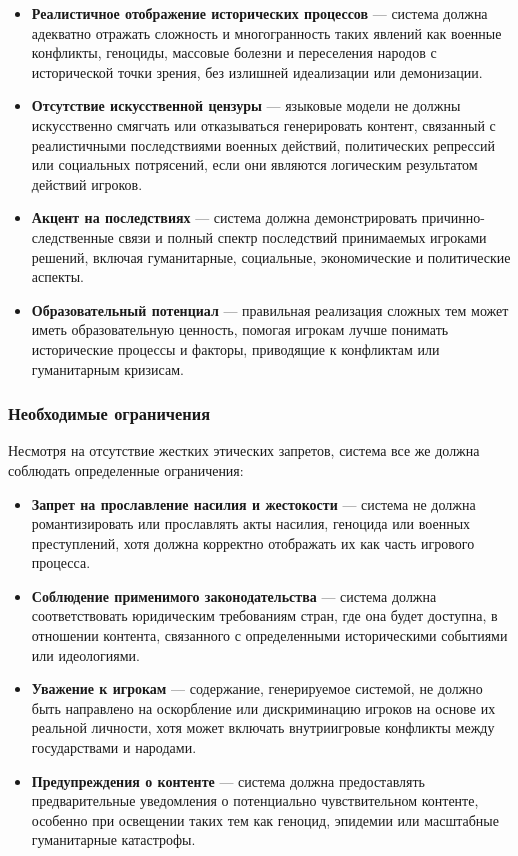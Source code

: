 \begin{itemize}
    \item \textbf{Реалистичное отображение исторических процессов} — система должна адекватно отражать сложность и многогранность таких явлений как военные конфликты, геноциды, массовые болезни и переселения народов с исторической точки зрения, без излишней идеализации или демонизации.

    \item \textbf{Отсутствие искусственной цензуры} — языковые модели не должны искусственно смягчать или отказываться генерировать контент, связанный с реалистичными последствиями военных действий, политических репрессий или социальных потрясений, если они являются логическим результатом действий игроков.

    \item \textbf{Акцент на последствиях} — система должна демонстрировать причинно-следственные связи и полный спектр последствий принимаемых игроками решений, включая гуманитарные, социальные, экономические и политические аспекты.

    \item \textbf{Образовательный потенциал} — правильная реализация сложных тем может иметь образовательную ценность, помогая игрокам лучше понимать исторические процессы и факторы, приводящие к конфликтам или гуманитарным кризисам.
\end{itemize}

\subsubsection{Необходимые ограничения}

Несмотря на отсутствие жестких этических запретов, система все же должна соблюдать определенные ограничения:

\begin{itemize}
    \item \textbf{Запрет на прославление насилия и жестокости} — система не должна романтизировать или прославлять акты насилия, геноцида или военных преступлений, хотя должна корректно отображать их как часть игрового процесса.

    \item \textbf{Соблюдение применимого законодательства} — система должна соответствовать юридическим требованиям стран, где она будет доступна, в отношении контента, связанного с определенными историческими событиями или идеологиями.

    \item \textbf{Уважение к игрокам} — содержание, генерируемое системой, не должно быть направлено на оскорбление или дискриминацию игроков на основе их реальной личности, хотя может включать внутриигровые конфликты между государствами и народами.

    \item \textbf{Предупреждения о контенте} — система должна предоставлять предварительные уведомления о потенциально чувствительном контенте, особенно при освещении таких тем как геноцид, эпидемии или масштабные гуманитарные катастрофы.
\end{itemize}

